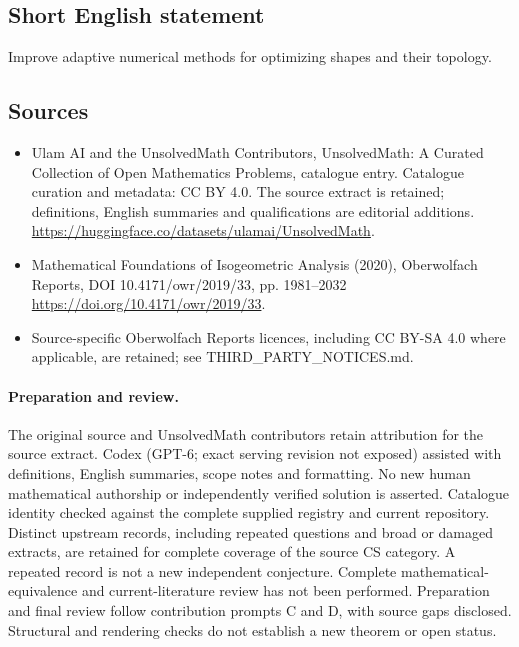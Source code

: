 \documentclass[11pt]{article}
\begin{document}
\subsection{Short English statement}
Improve adaptive numerical methods for optimizing shapes and their topology.
\subsection{Sources}
\begin{itemize}
\item[\hypertarget{source:statement:1}{S1}] Ulam AI and the UnsolvedMath Contributors, UnsolvedMath: A Curated Collection of Open Mathematics Problems, catalogue entry. Catalogue curation and metadata: CC BY 4.0. The source extract is retained; definitions, English summaries and qualifications are editorial additions.
\url{https://huggingface.co/datasets/ulamai/UnsolvedMath}.
\item[\hypertarget{source:statement:2}{S2}] Mathematical Foundations of Isogeometric Analysis (2020), Oberwolfach Reports, DOI 10.4171/owr/2019/33, pp. 1981--2032
\url{https://doi.org/10.4171/owr/2019/33}.
\item Source-specific Oberwolfach Reports licences, including CC BY-SA 4.0 where applicable, are retained; see THIRD\_PARTY\_NOTICES.md.
\end{itemize}
\paragraph{Preparation and review.}
The original source and UnsolvedMath contributors retain attribution for the source extract. Codex (GPT-6; exact serving revision not exposed) assisted with definitions, English summaries, scope notes and formatting. No new human mathematical authorship or independently verified solution is asserted. Catalogue identity checked against the complete supplied registry and current repository. Distinct upstream records, including repeated questions and broad or damaged extracts, are retained for complete coverage of the source CS category. A repeated record is not a new independent conjecture. Complete mathematical-equivalence and current-literature review has not been performed. Preparation and final review follow contribution prompts C and D, with source gaps disclosed. Structural and rendering checks do not establish a new theorem or open status.
\label{end:statement}
\end{document}

